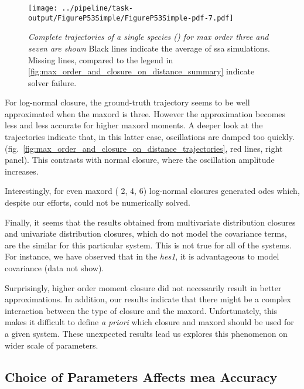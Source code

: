 \begin{figure}
    \centering
    \texttt{[image: ../pipeline/task-output/FigureP53Simple/FigureP53Simple-pdf-7.pdf]}
    \caption{\emph{Complete trajectories of a single species (\pft) for max order three and seven are shown} 
    Black lines indicate the average of \gls{ssa} simulations. 
    Missing lines, compared to the legend in \autoref{fig:max_order_and_closure_on_distance_summary} indicate solver failure.}
    \label{fig:max_order_and_closure_on_distance_trajectories}
\end{figure}

 
For log-normal closure, the ground-truth trajectory seems to be well approximated when the \gls{maxord} is three.
However the approximation becomes less and less accurate for higher \gls{maxord} moments.
A deeper look at the trajectories indicate that, in this latter case,
oscillations are damped too quickly. (fig.~\autoref{fig:max_order_and_closure_on_distance_trajectories}, red lines, right panel).
This contrasts with normal closure, where the oscillation amplitude increases.

Interestingly, for even \gls{maxord} (\ie{} 2, 4, 6) log-normal closures generated \gls{ode}s which, despite our efforts, could not be numerically solved.

Finally, it seems that the results obtained from multivariate distribution closures and univariate distribution closures,
 which do not model the covariance terms, are the similar for this particular system.
This is not true for all of the systems.
For instance, we have observed that in the \emph{hes1}, it is advantageous to model covariance (data not show).

Surprisingly, higher order moment closure did not necessarily result in better approximations.
In addition, our results indicate that there might be a complex interaction between the type of closure and the \gls{maxord}.
Unfortunately, this makes it difficult to define \emph{a priori} which closure and \gls{maxord} should be used for a given system.
These unexpected results lead us explores this phenomenon on wider scale of parameters.

\subsection{Choice of Parameters Affects \acrshort{mea} Accuracy}
\label{sec:hit-and-miss}

